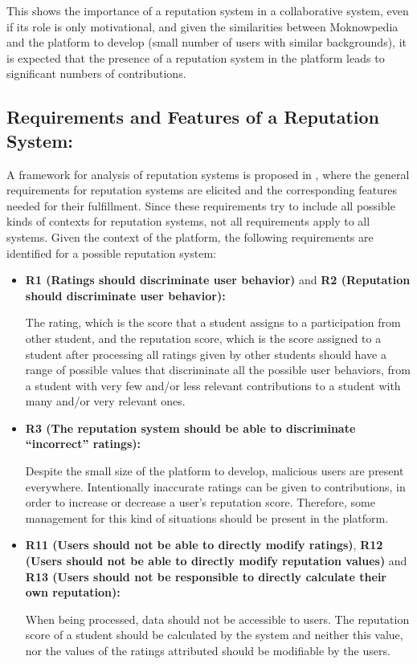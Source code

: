 This shows the importance of a reputation system in a collaborative system, even if its role is only motivational, and given the similarities between Moknowpedia and the platform to develop (small number of users with similar backgrounds), it is expected that the presence of a reputation system in the platform leads to significant numbers of contributions.
	
\subsection{Requirements and Features of a Reputation System:}

A framework for analysis of reputation systems is proposed in \cite{vavilis2014reference}, where the general requirements for reputation systems are elicited and the corresponding features needed for their fulfillment. Since these requirements try to include all possible kinds of contexts for reputation systems, not all requirements apply to all systems. Given the context of the platform, the following requirements are identified for a possible reputation system:

\begin{itemize}
\item  \textbf{R1 (Ratings should discriminate user behavior)} and \textbf{R2 (Reputation should discriminate user behavior): }

The rating, which is the score that a student assigns to a participation from other student, and the reputation score, which is the score assigned to a student after processing all ratings given by other students should have a range of possible values that discriminate all the possible user behaviors, from a student with very few and/or less relevant contributions to a student with many and/or very relevant ones.

\item \textbf{R3 (The reputation system should be able to discriminate ``incorrect'' ratings): }

Despite the small size of the platform to develop, malicious users are present everywhere. Intentionally inaccurate ratings can be given to contributions, in order to increase or decrease a user's reputation score. Therefore, some management for this kind of situations should be present in the platform.

\item \textbf{R11 (Users should not be able to directly modify ratings)}, \textbf{R12 (Users should not be able to directly modify reputation values)} and \textbf{R13 (Users should not be responsible to directly calculate their own reputation): }

When being processed, data should not be accessible to users. The reputation score of a student should be calculated by the system and neither this value, nor the values of the ratings attributed should be modifiable by the users.
\end{itemize}


